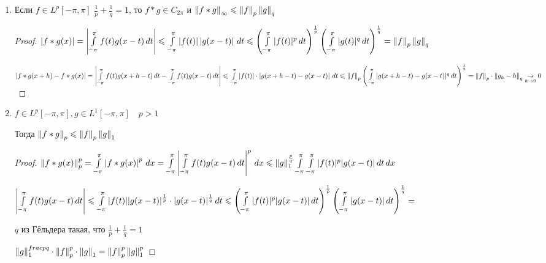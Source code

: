 \begin{consequence}
\begin{enumerate}
\begin{proof}
		\end{proof}
		
		\item
		Если $f\in L^p[-\pi, \pi]\,\,\frac{1}{p} + \frac{1}{q} = 1$, то $f*g \in C_{2\pi}$ и $\left\|f*g\right\|_\infty \leqslant \left\|f\right\|_p\left\|g\right\|_q $
		
		\begin{proof}\thmslashn
			
			$\left|f*g(x)\right| = \left|\int\limits_{-\pi}^\pi  f(t) g(x - t) \, dt\right| \leqslant \int\limits_{-\pi}^\pi \left|f(t)\right|\left|g(x - t)\right|\,dt \leqslant \left(\int\limits_{-\pi}^\pi  |f(t)|^p\,dt \right)^{\frac{1}{p}} \left(\int\limits_{-\pi}^\pi  |g(t)|^q\,dt \right)^{\frac{1}{q}} = \left\|f\right\|_p\left\|g\right\|_q$
			
			$\left|f*g(x + h) - f*g(x)\right| = \left|\int\limits_{-\pi}^\pi  f(t) g(x + h - t) \, dt - \int\limits_{-\pi}^\pi  f(t) g(x - t) \, dt\right| \leqslant \int\limits_{-\pi}^\pi  \left|f(t)\right|\cdot \left|g(x + h - t) - g(x - t)\right|  \, dt \leqslant \left\|f\right\|_p \left( \int\limits_{-\pi}^\pi |g(x + h - t) - g(x - t)|^q\,dt \right)^\frac{1}{q} = \left\|f\right\|_p\cdot\left\|g_h - h\right\|_q \underset{h\to 0}\to 0$
			
		\end{proof}
	
		\item
		$f \in L^p[-\pi, \pi], g \in L^1[-\pi, \pi]\quad p > 1$
		
		Тогда $\left\|f * g\right\|_p \leqslant \left\|f\right\|_p\left\|g\right\|_1$
		
		\begin{proof}\thmslashn
			
			$\left\|f*g(x)\right\|^p_p = \int\limits_{-\pi}^\pi  \left|f*g(x)\right|^p \, dx = \int\limits_{-\pi}^\pi \left| \int\limits_{-\pi}^\pi f(t) g(x - t)\,dt\right|^p\,dx \leqslant \left\|g\right\|_1^{\frac{p}{q}}  \int\limits_{-\pi}^\pi \int\limits_{-\pi}^\pi |f(t)|^p|g(x - t)|\,dt\,dx$
			
			$\left| \int\limits_{-\pi}^\pi f(t) g(x - t)\,dt\right| \leqslant  \int\limits_{-\pi}^\pi |f(t)||g(x - t)|^{\frac{1}{p}}\cdot |g(x - t)|^{\frac{1}{q}}\,dt \leqslant \left(\int\limits_{-\pi}^\pi |f(t)|^p |g(x - t)|\,dt \right)^{\frac{1}{p}}\left(\int\limits_{-\pi}^\pi |g(x - t)|\,dt \right)^{\frac{1}{q}} = $
			
			$q$ из Гёльдера такая, что $\frac{1}{p} + \frac{1}{q} = 1$
			
			 $\left\|g\right\|^{frac{p}{q}}_1 \cdot\left\|f\right\|^p_p\cdot\left\|g\right\|_1 = \left\|f\right\|^p_p\left\|g\right\|^p_1$
			
		\end{proof}
		
	\end{enumerate}
	
\end{consequence}

